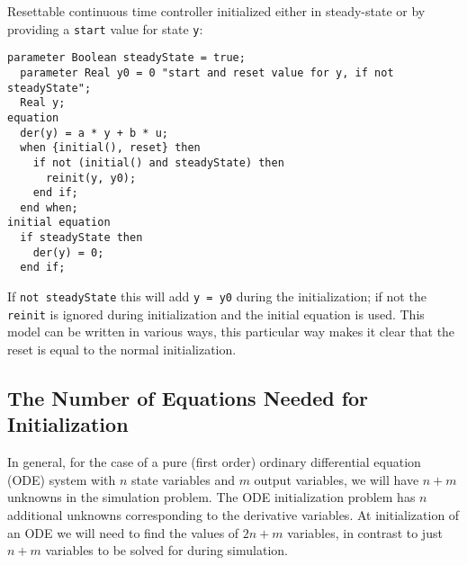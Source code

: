 \begin{example}
Resettable continuous time controller initialized either in steady-state or by providing a \lstinline!start! value for state \lstinline!y!:
\begin{lstlisting}[language=modelica]
  parameter Boolean steadyState = true;
  parameter Real y0 = 0 "start and reset value for y, if not steadyState";
  Real y;
equation
  der(y) = a * y + b * u;
  when {initial(), reset} then
    if not (initial() and steadyState) then
      reinit(y, y0);
    end if;
  end when;
initial equation
  if steadyState then
    der(y) = 0;
  end if;
\end{lstlisting}
If \lstinline!not steadyState! this will add \lstinline!y = y0! during the initialization; if not the \lstinline!reinit! is ignored during initialization and the initial equation is used.
This model can be written in various ways, this particular way makes it clear that the reset is equal to the normal initialization.
\end{example}

\subsection{The Number of Equations Needed for Initialization}\label{the-number-of-equations-needed-for-initialization}

\begin{nonnormative}
In general, for the case of a pure (first order) ordinary differential equation (ODE) system with $n$ state variables and $m$ output variables, we will have $n+m$ unknowns in the simulation problem.
The ODE initialization problem has $n$ additional unknowns corresponding to the derivative variables.
At initialization of an ODE we will need to find the values of $2n+m$ variables, in contrast to just $n+m$ variables to be solved for during simulation.
\end{nonnormative}

